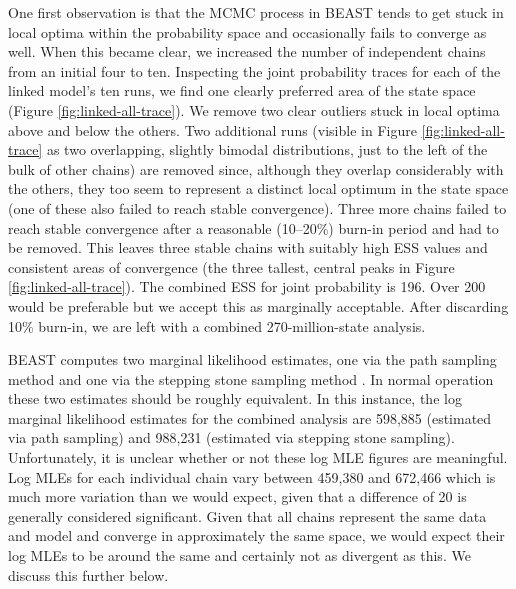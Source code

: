 \documentclass[]{article}
\begin{document}
One first observation is that the MCMC process in BEAST tends to get stuck in local optima within the probability space and occasionally fails to converge as well. When this became clear, we increased the number of independent chains from an initial four to ten. Inspecting the joint probability traces for each of the linked model's ten runs, we find one clearly preferred area of the state space (Figure \ref{fig:linked-all-trace}). We remove two clear outliers stuck in local optima above and below the others. Two additional runs (visible in Figure \ref{fig:linked-all-trace} as two overlapping, slightly bimodal distributions, just to the left of the bulk of other chains) are removed since, although they overlap considerably with the others, they too seem to represent a distinct local optimum in the state space (one of these also failed to reach stable convergence). Three more chains failed to reach stable convergence after a reasonable (10--20\%) burn-in period and had to be removed. This leaves three stable chains with suitably high ESS values and consistent areas of convergence (the three tallest, central peaks in Figure \ref{fig:linked-all-trace}). The combined ESS for joint probability is 196. Over 200 would be preferable but we accept this as marginally acceptable. After discarding 10\% burn-in, we are left with a combined 270-million-state analysis.

BEAST computes two marginal likelihood estimates, one via the path sampling method \autocite{baele_improving_2012} and one via the stepping stone sampling method \autocite{baele_accurate_2013}. In normal operation these two estimates should be roughly equivalent. In this instance, the log marginal likelihood estimates for the combined analysis are 598,885 (estimated via path sampling) and 988,231 (estimated via stepping stone sampling). Unfortunately, it is unclear whether or not these log MLE figures are meaningful. Log MLEs for each individual chain vary between 459,380 and 672,466 which is much more variation than we would expect, given that a difference of 20 is generally considered significant. Given that all chains represent the same data and model and converge in approximately the same space, we would expect their log MLEs to be around the same and certainly not as divergent as this. We discuss this further below.
\end{document}

